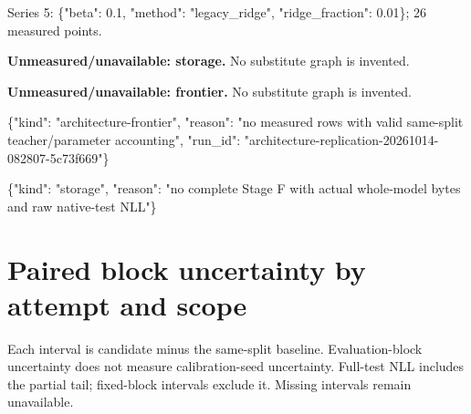 \documentclass[10pt]{article}
\begin{document}
\noindent\footnotesize Series 5: \{"beta": 0.1, "method": "legacy\_ridge", "ridge\_fraction": 0.01\}; 26 measured points.\par
\par\textbf{Unmeasured/unavailable: storage.} No substitute graph is invented.
\par\textbf{Unmeasured/unavailable: frontier.} No substitute graph is invented.
\par\small \{"kind": "architecture-frontier", "reason": "no measured rows with valid same-split teacher/parameter accounting", "run\_id": "architecture-replication-20261014-082807-5c73f669"\}
\par\small \{"kind": "storage", "reason": "no complete Stage F with actual whole-model bytes and raw native-test NLL"\}
\appendix\section{Paired block uncertainty by attempt and scope}
Each interval is candidate minus the same-split baseline. Evaluation-block uncertainty does not measure calibration-seed uncertainty. Full-test NLL includes the partial tail; fixed-block intervals exclude it. Missing intervals remain unavailable.
\end{document}
